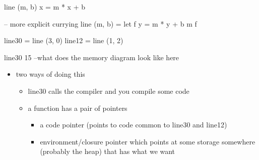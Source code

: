 \documentclass[11pt]{article}
\begin{document}
line (m, b) x = m * x + b

-- more explicit currying
line (m, b) = let 
     f y = m * y + b
     m f

line30 = line (3, 0)
line12 = line (1, 2)

line30 15 --what does the memory diagram look like here

\begin{itemize}
\item two ways of doing this
\begin{itemize}
\item line30 calls the compiler and you compile some code
\item a function has a pair of pointers
\begin{itemize}
\item a code pointer (points to code common to line30 and line12)
\item environment/closure pointer which points at some storage somewhere (probably the heap)
that has what we want
\end{itemize}
\end{itemize}
\end{itemize}
\end{document}
